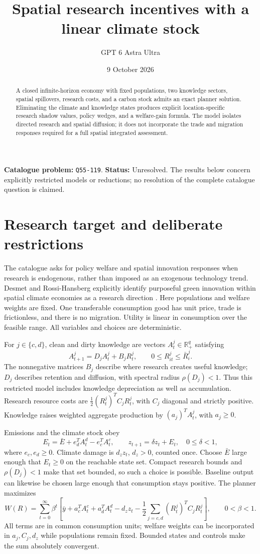 \documentclass[11pt,a4paper]{article}
\title{Spatial research incentives with a linear climate stock}
\author{GPT 6 Astra Ultra}
\date{9 October 2026}
\theoremstyle{definition}
\theoremstyle{remark}
\newcommand{\R}{\mathbb R}
\begin{document}
\maketitle
\noindent\textbf{Catalogue problem:} \texttt{Q55-119}. \textbf{Status:} Unresolved. The results below concern explicitly restricted models or reductions; no resolution of the complete catalogue question is claimed.

\begin{abstract}
A closed infinite-horizon economy with fixed populations, two knowledge sectors, spatial spillovers, research costs, and a carbon stock admits an exact planner solution. Eliminating the climate and knowledge states produces explicit location-specific research shadow values, policy wedges, and a welfare-gain formula. The model isolates directed research and spatial diffusion; it does not incorporate the trade and migration responses required for a full spatial integrated assessment.
\end{abstract}
\section{Research target and deliberate restrictions}
The catalogue asks for policy welfare and spatial innovation responses when research is endogenous, rather than imposed as an exogenous technology trend. Desmet and Rossi-Hansberg explicitly identify purposeful green innovation within spatial climate economies as a research direction \cite{DRH}. Here populations and welfare weights are fixed. One transferable consumption good has unit price, trade is frictionless, and there is no migration. Utility is linear in consumption over the feasible range. All variables and choices are deterministic.

For $j\in\{c,d\}$, clean and dirty knowledge are vectors $A_t^j\in\R_+^q$ satisfying
\[
 A_{t+1}^j=D_jA_t^j+B_jR_t^j,
 \qquad 0\le R_{it}^j\le\bar R_i^j.
 \tag{1}
\]
The nonnegative matrices $B_j$ describe where research creates useful knowledge; $D_j$ describes retention and diffusion, with spectral radius $\rho(D_j)<1$. Thus this restricted model includes knowledge depreciation as well as accumulation. Research resource costs are $\tfrac12(R_t^j)^TC_jR_t^j$, with $C_j$ diagonal and strictly positive. Knowledge raises weighted aggregate production by $(a_j)^TA_t^j$, with $a_j\ge0$.

Emissions and the climate stock obey
\[
 E_t=\bar E+e_d^TA_t^d-e_c^TA_t^c,
 \qquad z_{t+1}=\delta z_t+E_t,
 \quad 0\le\delta<1,
 \tag{2}
\]
where $e_c,e_d\ge0$. Climate damage is $d_z z_t$, $d_z>0$, counted once. Choose $\bar E$ large enough that $E_t\ge0$ on the reachable state set. Compact research bounds and $\rho(D_j)<1$ make that set bounded, so such a choice is possible. Baseline output can likewise be chosen large enough that consumption stays positive. The planner maximizes
\[
 W(R)=\sum_{t=0}^\infty\beta^t\left[
 \bar y+a_c^TA_t^c+a_d^TA_t^d-d_zz_t
 -\frac12\sum_{j=c,d}(R_t^j)^TC_jR_t^j\right],
 \qquad 0<\beta<1.
 \tag{3}
\]
All terms are in common consumption units; welfare weights can be incorporated in $a_j,C_j,d_z$ while populations remain fixed. Bounded states and controls make the sum absolutely convergent.
\end{document}
